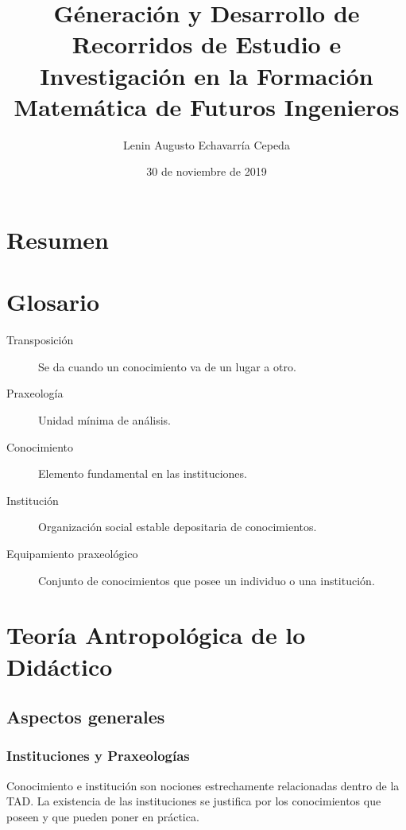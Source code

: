 \documentclass[12pt,spanish,]{book}
\title{Géneración y Desarrollo de Recorridos de Estudio e Investigación en la Formación Matemática de Futuros Ingenieros}
\author{Lenin Augusto Echavarría Cepeda}
\date{30 de noviembre de 2019}
\begin{document}
\maketitle

{
\setcounter{tocdepth}{1}
\tableofcontents
}
\hypertarget{resumen}{%
\chapter*{Resumen}\label{resumen}}

\hypertarget{glosario}{%
\chapter*{Glosario}\label{glosario}}

\begin{description}
\item[Transposición]
Se da cuando un conocimiento va de un lugar a otro.
\item[Praxeología]
Unidad mínima de análisis.
\item[Conocimiento]
Elemento fundamental en las instituciones.
\item[Institución]
Organización social estable depositaria de conocimientos.
\item[Equipamiento praxeológico]
Conjunto de conocimientos que posee un individuo o una institución.
\end{description}

\hypertarget{teoruxeda-antropoluxf3gica-de-lo-diduxe1ctico}{%
\chapter{Teoría Antropológica de lo Didáctico}\label{teoruxeda-antropoluxf3gica-de-lo-diduxe1ctico}}

\hypertarget{aspectos-generales}{%
\section{Aspectos generales}\label{aspectos-generales}}

\hypertarget{instituciones-y-praxeologuxedas}{%
\subsection{Instituciones y Praxeologías}\label{instituciones-y-praxeologuxedas}}

Conocimiento e institución son nociones estrechamente relacionadas dentro de la TAD. La existencia de las instituciones se justifica por los conocimientos que poseen y que pueden poner en práctica.
\end{document}
